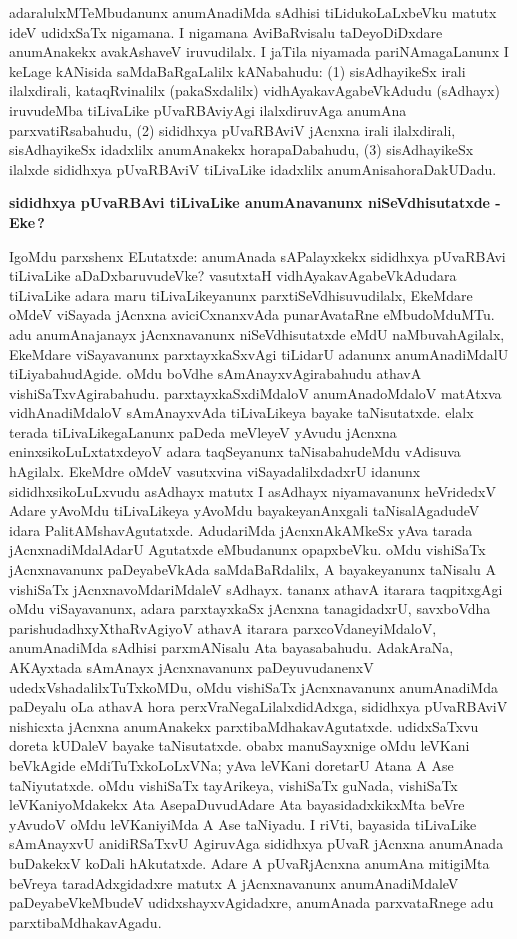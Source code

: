 adaralulxMTeMbudanunx anumAnadiMda sAdhisi tiLidukoLaLxbeVku matutx ideV udidxSaTx nigamana. I nigamana AviBaRvisalu taDeyoDiDxdare anumAnakekx avakAshaveV iruvudilalx. I jaTila niyamada pariNAmagaLanunx I keLage kANisida saMdaBaRgaLalilx kANabahudu: (1) sisAdhayikeSx irali ilalxdirali, kataqRvinalilx (pakaSxdalilx) vidhAyakavAgabeVkAdudu (sAdhayx) iruvudeMba tiLivaLike pUvaRBAviyAgi ilalxdiruvAga anumAna parxvatiRsabahudu, (2) sididhxya pUvaRBAviV jAcnxna irali ilalxdirali, sisAdhayikeSx idadxlilx anumAnakekx horapaDabahudu, (3) sisAdhayikeSx ilalxde sididhxya pUvaRBAviV tiLivaLike idadxlilx anumAnisahoraDakUDadu.

\medskip
\begin{center}
{\Large\bf sididhxya pUvaRBAvi tiLivaLike anumAnavanunx niSeVdhisutatxde - Eke\,?}
\end{center}

IgoMdu parxshenx ELutatxde: anumAnada sAPalayxkekx sididhxya pUvaRBAvi tiLi\-vaLike aDaDxbaruvudeVke? vasutxtaH vidhAyakavAgabeVkAdudara tiLivaLike adara maru tiLi\-vaLikeyanunx parxtiSeVdhisuvudilalx, EkeMdare oMdeV viSayada jAcnxna aviciCxnanxvAda puna\-rA\-vataRne eMbudoMduMTu. adu anumAnajanayx jAcnxnavanunx niSeVdhisutatxde eMdU naMbuvahAgilalx, EkeMdare viSayavanunx parxtayxkaSxvAgi tiLidarU adanunx anumAna\-diMdalU tiLiyabahudAgide. oMdu boVdhe sAmAnayxvAgirabahudu athavA vishiSaTx\-vAgirabahudu. parxtayxkaSxdiMdaloV anumAnadoMdaloV matAtxva vidhAna\-diMdaloV sAmAnayxvAda tiLivaLikeya bayake taNisutatxde. elalx terada tiLivaLikegaLanunx paDeda meVleyeV yAvudu jAcnxna eninxsikoLuLxtatxdeyoV adara taqSeyanunx taNisabahudeMdu vAdisuva hAgilalx. EkeMdre oMdeV vasutxvina viSayadalilxdadxrU idanunx sididhxsi\-koLuLx\-vudu asAdhayx matutx I asAdhayx niyamavanunx heVridedxV Adare yAvoMdu tiLi\-vaLikeya yAvoMdu bayakeyanAnxgali taNisalAgadudeV idara PalitAMshavAgutatxde. Aduda\-riMda jAcnxnAkAMkeSx yAva tarada jAcnxnadiMdalAdarU Agutatxde eMbudanunx opapxbeVku. oMdu vishiSaTx jAcnxnavanunx paDeyabeVkAda saMdaBaRdalilx, A bayakeyanunx taNisalu A vishiSaTx jAcnxnavoMdariMdaleV sAdhayx. tananx athavA itarara taqpitxgAgi oMdu viSaya\-vanunx, adara parxtayxkaSx jAcnxna tanagidadxrU, savxboVdha pari\-shudadhxyXthaRvAgiyoV athavA itarara parxcoVdaneyiMdaloV, anumAnadiMda sAdhisi parxmANisalu Ata bayasabahudu. AdakAraNa, AKAyxtada  sAmAnayx jAcnxnavanunx paDeyuvudanenxV udedxVsha\-dalilxTuTxkoMDu, oMdu vishiSaTx jAcnxnavanunx anumAnadiMda paDeyalu oLa athavA hora perxVraNegaLilalxdidAdxga, sididhxya pUvaRBAviV nishicxta jAcnxna anumAnakekx parxtibaMdhaka\-vAgutatxde. udidxSaTxvu doreta kUDaleV bayake taNisutatxde. obabx manuSayxnige oMdu leVKani beVkAgide eMdiTuTx\-koLoLxVNa; yAva leVKani doretarU Atana A Ase taNiyu\-tatxde. oMdu vishiSaTx tayArikeya, vishiSaTx guNada, vishiSaTx leVKaniyoMdakekx Ata AsepaDuvudAdare Ata bayasidadxkikxMta beVre yAvudoV oMdu leVKani\-yiMda A Ase taNiyadu. I riVti, bayasida tiLivaLike sAmAnayxvU anidiRSaTxvU AgiruvAga sididhxya pUvaR jAcnxna anumAnada buDakekxV koDali hAkutatxde. Adare A pUvaR\-jAcnxna anumAna mitigiMta beVreya taradAdxgidadxre matutx A jAcnxnavanunx anumAnadiMdaleV paDeyabeVkeMbudeV udidxshayxvAgidadxre, anumAnada parxvataRnege adu parxtibaMdhaka\-vAgadu.


